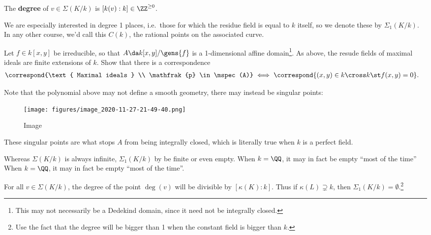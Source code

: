 \begin{definition}[?]

The \textbf{degree} of \(v\in \Sigma(K/k)\) is
\([k(v) : k] \in \ZZ^{\geq 0}\).

\end{definition}

We are especially interested in degree 1 places, i.e.~those for which
the residue field is equal to \(k\) itself, so we denote these by
\(\Sigma_1(K/k)\). In any other course, we'd call this \(C(k)\), the
rational points on the associated curve.

\begin{exercise}

Let \(f\in k[x, y]\) be irreducible, so that
\(A \da k[x, y] / \gens{f}\) is a 1-dimensional affine
domain\footnote{This may not necessarily be a Dedekind domain, since it
  need not be integrally closed.}. As above, the resude fields of
maximal ideals are finite extensions of \(k\). Show that there is a
correspondence
\begin{align*}  
\correspond{\text{ Maximal ideals } \\ \mathfrak{p} \in \mspec(A)}
&\iff
\correspond{(x, y) \in k\cross k \st f(x, y) = 0}
.\end{align*}

\end{exercise}

\begin{remark}

Note that the polynomial above may not define a smooth geometry, there
may instead be singular points:

\begin{figure}
\centering
\texttt{[image: figures/image\_2020-11-27-21-49-40.png]}
\caption{Image}
\end{figure}

These singular points are what stops \(A\) from being integrally closed,
which is literally true when \(k\) is a perfect field.

\end{remark}

Whereas \(\Sigma(K/k)\) is always infinite, \(\Sigma_1(K/k)\) by be
finite or even empty. When \(k = \QQ\), it may in fact be empty ``most
of the time'' When \(k = \QQ\), it may in fact be empty ``most of the
time''.

\begin{exercise}[?]

For all \(v\in \Sigma(K/k)\), the degree of the point \(\deg(v)\) will
be divisible by \([\kappa(K) : k]\). Thus if \(\kappa(L) \supsetneq k\),
then \(\Sigma_1(K/k) = \emptyset\).\footnote{Use the fact that the
  degree will be bigger than 1 when the constant field is bigger than
  \(k\).}

\end{exercise}

